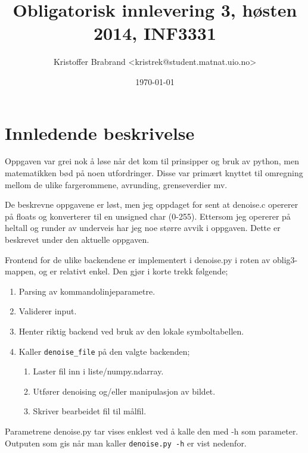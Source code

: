 \documentclass{article}
\title{Obligatorisk innlevering 3, høsten 2014, INF3331}
\author{Kristoffer Brabrand <kristrek@student.matnat.uio.no>}
\date{\today}
\begin{document}
\maketitle

\section*{Innledende beskrivelse}
Oppgaven var grei nok å løse når det kom til prinsipper og bruk av python, men matematikken bød på noen utfordringer. Disse var primært knyttet til omregning mellom de ulike fargerommene, avrunding, grenseverdier mv.

De beskrevne oppgavene er løst, men jeg oppdaget for sent at denoise.c opererer på floats og konverterer til en unsigned char (0-255). Ettersom jeg opererer på heltall og runder av underveis har jeg noe større avvik i oppgaven. Dette er beskrevet under den aktuelle oppgaven.

Frontend for de ulike backendene er implementert i denoise.py i roten av oblig3-mappen, og er relativt enkel. Den gjør i korte trekk følgende;

\begin{enumerate}
  \item Parsing av kommandolinjeparametre.
  \item Validerer input.
  \item Henter riktig backend ved bruk av den lokale symboltabellen.
  \item Kaller \verb;denoise_file; på den valgte backenden;
  \begin{enumerate}
  	\item Laster fil inn i liste/numpy.ndarray.
  	\item Utfører denoising og/eller manipulasjon av bildet.
  	\item Skriver bearbeidet fil til målfil.
  \end{enumerate}
\end{enumerate}

Parametrene denoise.py tar vises enklest ved å kalle den med -h som parameter. Outputen som gis når man kaller \verb;denoise.py -h; er vist nedenfor.













\end{document}
